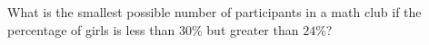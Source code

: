 What is the smallest possible number of participants in a math club if the percentage of girls is less than $30\%$ but greater than $24\%$?
